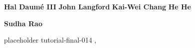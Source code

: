 \begin{bio}
  {\bfseries Hal Daumé III} 
  {\bfseries John Langford}
  {\bfseries Kai-Wei Chang}
  {\bfseries He He}

  {\bfseries Sudha Rao}

\end{bio}

\begin{tutorial}
  {placeholder}
  {tutorial-final-014}
  {\daydateyear, \tutorialmorningtime}
  {\TutLocA}


\end{tutorial}
